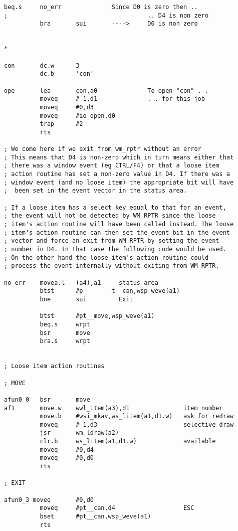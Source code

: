 \begin{lstlisting}[firstnumber=1,caption={George's Linked List Example Program}]
          beq.s     no_err              Since D0 is zero then ..
;                                       .. D4 is non zero
          bra       sui       ---->     D0 is non zero


*

con       dc.w      3
          dc.b      'con'

ope       lea       con,a0              To open "con" . .
          moveq     #-1,d1              . . for this job
          moveq     #0,d3
          moveq     #io_open,d0
          trap      #2
          rts

; We come here if we exit from wm_rptr without an error
; This means that D4 is non-zero which in turn means either that 
; there was a window event (eg CTRL/F4) or that a loose item 
; action routine has set a non-zero value in D4. If there was a  
; window event (and no loose item) the appropriate bit will have
;  been set in the event vector in the status area.

; If a loose item has a select key equal to that for an event, 
; the event will not be detected by WM_RPTR since the loose 
; item's action routine will have been called instead. The loose
; item's action routine can then set the event bit in the event
; vector and force an exit from WM_RPTR by setting the event 
; number in D4. In that case the following code would be used.
; On the other hand the loose item's action routine could  
; process the event internally without exiting from WM_RPTR.

no_err    movea.l   (a4),a1     status area
          btst      #p        t__can,wsp_weve(a1)
          bne       sui         Exit

          btst      #pt__move,wsp_weve(a1)
          beq.s     wrpt
          bsr       move
          bra.s     wrpt


; Loose item action routines

; MOVE

afun0_0   bsr       move
af1       move.w    wwl_item(a3),d1               item number
          move.b    #wsi_mkav,ws_litem(a1,d1.w)   ask for redraw
          moveq     #-1,d3                        selective draw
          jsr       wm_ldraw(a2)
          clr.b     ws_litem(a1,d1.w)             available
          moveq     #0,d4
          moveq     #0,d0
          rts

; EXIT

afun0_3 moveq       #0,d0
          moveq     #pt__can,d4                   ESC
          bset      #pt__can,wsp_weve(a1)
          rts


\end{lstlisting}
